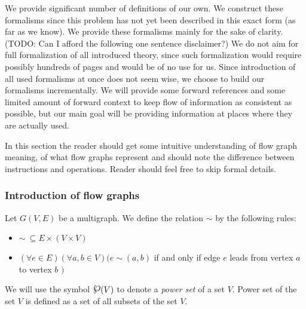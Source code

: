 

We provide significant number of definitions of our own. We construct these formalisms since this problem has not yet been described in this exact form (as far as we know).  We provide these formalisms mainly for the sake of clarity. (TODO: Can I afford the following one sentence disclaimer?) We do not aim for full formalization of all introduced theory, since such formalization would require possibly hundreds of pages and would be of no use for us. Since introduction of all used formalisms at once does not seem wise, we choose to build our formalisms incrementally. We will provide some forward references and some limited amount of forward context to keep flow of information as consistent as possible, but our main goal will be providing information at places where they are actually used.


In this section the reader should get some intuitive understanding of flow graph meaning, of what flow graphs represent and should note the difference between instructions and operations. Reader should feel free to skip formal details.

\subsubsection{Introduction of flow graphs}

\begin{define}
  Let $G(V,E)$ be a multigraph. We define the relation $\sim$ by the following rules:
  \begin{itemize}
  \item $\sim \ \subseteq E \times (V \times V)$ 
  \item $ (\forall e \in E)(\forall a,b \in V)( e \sim (a,b) $ if and only if edge $e$ leads from vertex $a$ to vertex $b$ $)$
  \end{itemize}
\end{define}


\begin{define}[powerset] We will use the symbol $\powerset(V)$ to denote a \emph{power set} of a set $V$. Power set of the set $V$ is defined as a set of all subsets of the set $V$.
\end{define}


